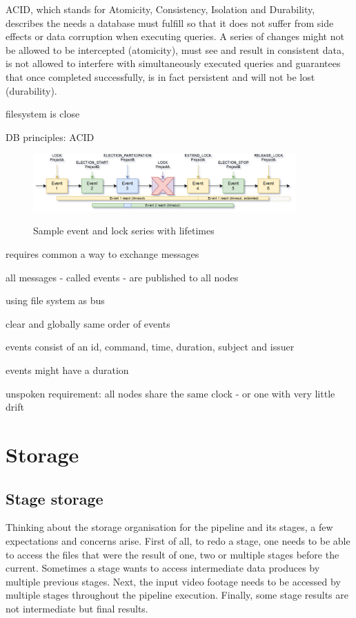 ACID, which stands for Atomicity, Consistency, Isolation and Durability, describes the needs a database must fulfill so that it does not suffer from side effects or data corruption when executing queries.
A series of changes might not be allowed to be intercepted (atomicity), must see and result in consistent data, is not allowed to interfere with simultaneously executed queries and guarantees that once completed successfully, is in fact persistent and will not be lost (durability).

filesystem is close

DB principles: ACID


\begin{figure}[h]
	\includegraphics[width=0.9\textwidth]{events.png}
	\label{winslow:com:events}
	\caption{Sample event and lock series with lifetimes}
\end{figure}

requires common a way to exchange messages

all messages - called events - are published to all nodes

using file system as bus

clear and globally same order of events

events consist of an id, command, time, duration, subject and issuer

events might have a duration

unspoken requirement: all nodes share the same clock - or one with very little drift



\section{Storage}

\subsection{Stage storage}


Thinking about the storage organisation for the pipeline and its stages, a few expectations and concerns arise.
First of all, to redo a stage, one needs to be able to access the files that were the result of one, two or multiple stages before the current.
Sometimes a stage wants to access intermediate data produces by multiple previous stages.
Next, the input video footage needs to be accessed by multiple stages throughout the pipeline execution.
Finally, some stage results are not intermediate but final results.

